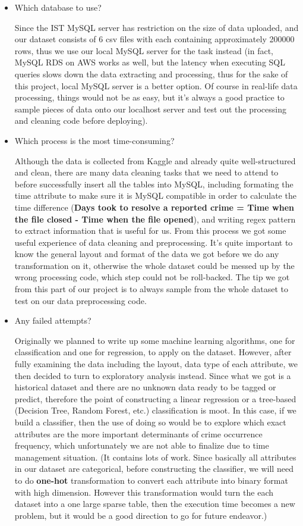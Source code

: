 \documentclass{article} %
\begin{document}
\begin{itemize}
\item Which database to use?

Since the IST MySQL server has restriction on the size of data uploaded, and our dataset consists of 6 csv files with each containing approximately 200000 rows, thus we use our local MySQL server for the task instead (in fact, MySQL RDS on AWS works as well, but the latency when executing SQL queries slows down the data extracting and processing, thus for the sake of this project, local MySQL server is a better option. Of course in real-life data processing, things would not be as easy, but it's always a good practice to sample pieces of data onto our localhost server and test out the processing and cleaning code before deploying).

\item Which process is the most time-consuming?

Although the data is collected from Kaggle and already quite well-structured and clean, there are many data cleaning tasks that we need to attend to before successfully insert all the tables into MySQL, including formating the time attribute to make sure it is MySQL compatible in order to calculate the time difference (\textbf{Days took to resolve a reported crime = Time when the file closed - Time when the file opened}), and writing regex pattern to extract information that is useful for us. From this process we got some useful experience of data cleaning and preprocessing. It's quite important to know the general layout and format of the data we got before we do any transformation on it,  otherwise the whole dataset could be messed up by the wrong processing code, which step could not be roll-backed. The tip we got from this part of our project is to always sample from the whole dataset to test on our data preprocessing code.

\item Any failed attempts?

Originally we planned to write up some machine learning algorithms, one for classification and one for regression, to apply on the dataset. However, after fully examining the data including the layout, data type of each  attribute, we then decided to turn to exploratory analysis instead. Since what we got is a historical dataset and there are no unknown data ready to be tagged or predict, therefore the point of constructing a linear regression or a tree-based (Decision Tree, Random Forest, etc.) classification is moot. In this case, if we build a classifier, then the use of doing so would be to explore which exact attributes are the more important determinants of crime occurrence frequency, which unfortunately we are not able to finalize due to time management situation. (It contains lots of work. Since basically all attributes in our dataset are categorical, before constructing the classifier, we will need to do \textbf{one-hot} transformation to convert each attribute into binary format  with high dimension. However this transformation would turn the each dataset into a one large sparse table, then the execution time becomes a new problem, but it would be a good direction to go for future endeavor.)


\end{itemize}
\end{document}
